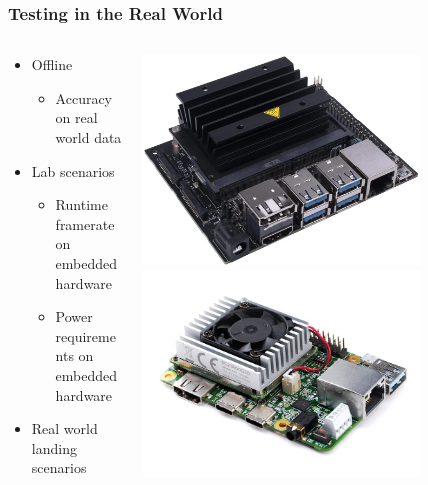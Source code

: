 \documentclass[aspectratio=169]{rubeamer}
\newcommand{\nologo}{\setbeamertemplate{logo}{}}
\newif\ifpause
\newcommand{\mypause}{\ifpause \pause \fi}
\begin{document}
\nologo
\begin{frame}
  \frametitle{Testing in the Real World}
  \begin{columns}
    \begin{column}{0.6\textwidth}
      \begin{itemize}
        \item<1-> Offline
        \begin{itemize}
          \item<1-> Accuracy on real world data
        \end{itemize}
        \item<2-> Lab scenarios
        \begin{itemize}
          \item<2-> Runtime framerate on embedded hardware
          \item<2-> Power requirements on embedded hardware
        \end{itemize}
        \mypause
        \item<3-> Real world landing scenarios
      \end{itemize}
    \end{column}
    {
      \begin{column}{0.4\textwidth}
      \centering
        \includegraphics[width=0.75\textwidth]{jetson_nano}\\
        \includegraphics[width=0.75\textwidth]{google_coral}
      \end{column}
    }
    \mypause
  \end{columns}
\end{frame}
\end{document}
